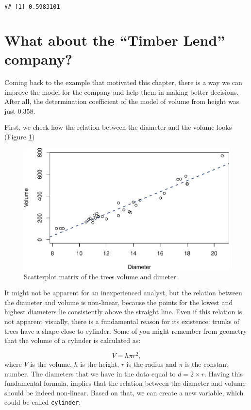 \documentclass[
]{book}
\theoremstyle{definition}
\theoremstyle{definition}
\theoremstyle{definition}
\theoremstyle{definition}
\theoremstyle{remark}
\begin{document}
\begin{verbatim}
## [1] 0.5983101
\end{verbatim}

\section{What about the ``Timber Lend'' company?}\label{what-about-the-timber-lend-company}

Coming back to the example that motivated this chapter, there is a way we can improve the model for the company and help them in making better decisions. After all, the determination coefficient of the model of volume from height was just 0.358.

First, we check how the relation between the diameter and the volume looks (Figure \ref{fig:TreesLineDiameter})

\begin{figure}
\centering
\includegraphics{Svetunkov---Statistics-for-Business-Analytics_files/figure-latex/TreesLineDiameter-1.pdf}
\caption{\label{fig:TreesLineDiameter}Scatterplot matrix of the trees volume and dimeter.}
\end{figure}

It might not be apparent for an inexperienced analyst, but the relation between the diameter and volume is non-linear, because the points for the lowest and highest diameters lie consistently above the straight line. Even if this relation is not apparent visually, there is a fundamental reason for its existence: trunks of trees have a shape close to cylinder. Some of you might remember from geometry that the volume of a cylinder is calculated as:

\begin{equation}
    V = h \pi r^2 ,
    \label{eq:cylinderFormula}
\end{equation}
where \(V\) is the volume, \(h\) is the height, \(r\) is the radius and \(\pi\) is the constant number. The diameters that we have in the data equal to \(d=2 \times r\). Having this fundamental formula, implies that the relation between the diameter and volume should be indeed non-linear. Based on that, we can create a new variable, which could be called \texttt{cylinder}:
\end{document}
